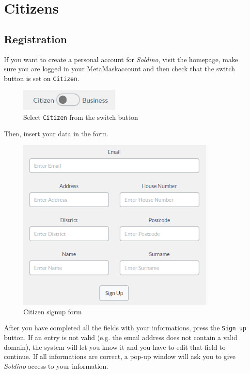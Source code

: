 \section{Citizens}
	\subsection{Registration}
	If you want to create a personal account for \textit{Soldino}, visit the
	homepage, make sure you are logged in your MetaMask\glosp account
	and then check that the switch button is set on \texttt{Citizen}.\\
	\begin{figure}[H]
		\includegraphics[width=5cm]{res/images/user_citizen.png}
		\centering
		\caption{Select \texttt{Citizen} from the switch button}
	\end{figure}	
	\noindent Then, insert your data in the form. 
	\begin{figure}[H]
		\includegraphics[width=10cm]{res/images/citizen_signup.png}
		\centering
		\caption{Citizen signup form}
	\end{figure}
	\noindent After you have completed all the
	fields with your informations, press the \texttt{Sign up} button. If an entry 
	is not valid (e.g. the email address does not contain a valid domain), 
	the system will let you know it and you have to edit that field to continue.
	If all informations are correct, a pop-up window will ask you 
	to give \textit{Soldino} access to your information.\\
